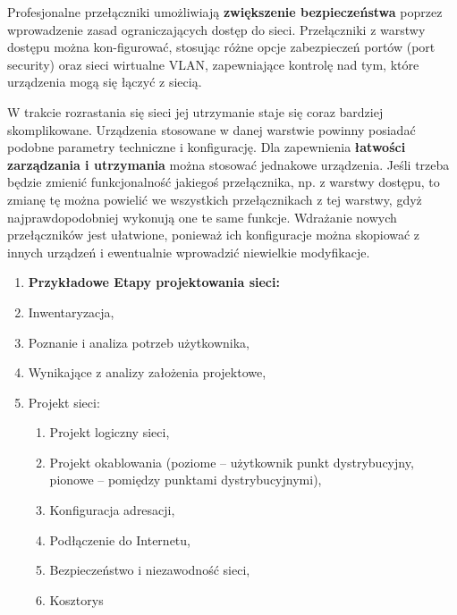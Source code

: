 Profesjonalne przełączniki umożliwiają \textbf{zwiększenie bezpieczeństwa} poprzez wprowadzenie zasad ograniczających dostęp do sieci. Przełączniki z warstwy dostępu można kon-figurować, stosując różne opcje zabezpieczeń portów (port security) oraz sieci wirtualne VLAN, zapewniające kontrolę nad tym, które urządzenia mogą się łączyć z siecią.

W trakcie rozrastania się sieci jej utrzymanie staje się coraz bardziej skomplikowane. Urządzenia stosowane w danej warstwie powinny posiadać podobne parametry techniczne i konfigurację. Dla zapewnienia \textbf{łatwości zarządzania i utrzymania} można stosować jednakowe urządzenia. Jeśli trzeba będzie zmienić funkcjonalność jakiegoś przełącznika, np. z warstwy dostępu, to zmianę tę można powielić we wszystkich przełącznikach z tej warstwy, gdyż najprawdopodobniej wykonują one te same funkcje. Wdrażanie nowych przełączników jest ułatwione, ponieważ ich konfiguracje można skopiować z innych urządzeń i ewentualnie wprowadzić niewielkie modyfikacje.


\begin{enumerate}
	\item[] \textbf{Przykładowe Etapy projektowania sieci: }
	\item Inwentaryzacja,
	\item Poznanie i analiza potrzeb użytkownika,
	\item Wynikające z analizy założenia projektowe,
	\item Projekt sieci:
	\begin{enumerate}
		\item Projekt logiczny sieci,
		\item Projekt okablowania (poziome – użytkownik punkt dystrybucyjny, pionowe – pomiędzy punktami dystrybucyjnymi),
		\item Konfiguracja adresacji,
		\item Podłączenie do Internetu,
		\item Bezpieczeństwo i niezawodność sieci,
		\item Kosztorys
	\end{enumerate}
\end{enumerate}